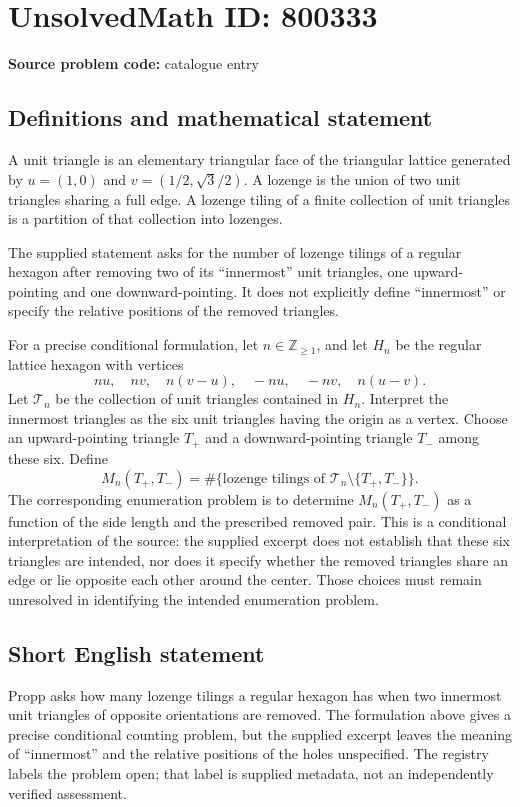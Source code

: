 \documentclass[11pt]{article}
\newcommand{\Z}{\mathbb{Z}}
\begin{document}
\section*{UnsolvedMath ID: 800333}
\textbf{Source problem code:} catalogue entry
\subsection{Definitions and mathematical statement}
A unit triangle is an elementary triangular face of the triangular lattice generated by \(u=(1,0)\) and \(v=(1/2,\sqrt{3}/2)\). A lozenge is the union of two unit triangles sharing a full edge. A lozenge tiling of a finite collection of unit triangles is a partition of that collection into lozenges.

The supplied statement asks for the number of lozenge tilings of a regular hexagon after removing two of its ``innermost'' unit triangles, one upward-pointing and one downward-pointing. It does not explicitly define ``innermost'' or specify the relative positions of the removed triangles.

For a precise conditional formulation, let \(n\in\Z_{\geq 1}\), and let \(H_n\) be the regular lattice hexagon with vertices
\[
nu,\quad nv,\quad n(v-u),\quad -nu,\quad -nv,\quad n(u-v).
\]
Let \(\mathcal{T}_n\) be the collection of unit triangles contained in \(H_n\). Interpret the innermost triangles as the six unit triangles having the origin as a vertex. Choose an upward-pointing triangle \(T_+\) and a downward-pointing triangle \(T_-\) among these six. Define
\[
M_n(T_+,T_-)
=\#\bigl\{\text{lozenge tilings of }\mathcal{T}_n\setminus\{T_+,T_-\}\bigr\}.
\]
The corresponding enumeration problem is to determine \(M_n(T_+,T_-)\) as a function of the side length and the prescribed removed pair. This is a conditional interpretation of the source: the supplied excerpt does not establish that these six triangles are intended, nor does it specify whether the removed triangles share an edge or lie opposite each other around the center. Those choices must remain unresolved in identifying the intended enumeration problem.
\subsection{Short English statement}
Propp asks how many lozenge tilings a regular hexagon has when two innermost unit triangles of opposite orientations are removed. The formulation above gives a precise conditional counting problem, but the supplied excerpt leaves the meaning of ``innermost'' and the relative positions of the holes unspecified. The registry labels the problem open; that label is supplied metadata, not an independently verified assessment.
\end{document}
